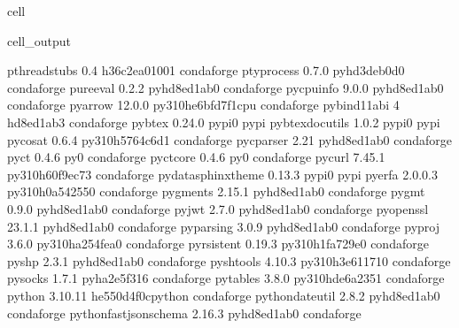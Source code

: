 \documentclass[letterpaper,table,10pt,english]{jupyterBook}
\begin{document}
\begin{sphinxuseclass}{cell}
\begin{sphinxVerbatimOutput}
\begin{sphinxuseclass}{cell_output}
\begin{sphinxVerbatim}[commandchars=\\\{\}]
pthread\PYGZhy{}stubs             0.4               h36c2ea0\PYGZus{}1001    conda\PYGZhy{}forge
ptyprocess                0.7.0              pyhd3deb0d\PYGZus{}0    conda\PYGZhy{}forge
pure\PYGZus{}eval                 0.2.2              pyhd8ed1ab\PYGZus{}0    conda\PYGZhy{}forge
py\PYGZhy{}cpuinfo                9.0.0              pyhd8ed1ab\PYGZus{}0    conda\PYGZhy{}forge
pyarrow                   12.0.0          py310he6bfd7f\PYGZus{}1\PYGZus{}cpu    conda\PYGZhy{}forge
pybind11\PYGZhy{}abi              4                    hd8ed1ab\PYGZus{}3    conda\PYGZhy{}forge
pybtex                    0.24.0                   pypi\PYGZus{}0    pypi
pybtex\PYGZhy{}docutils           1.0.2                    pypi\PYGZus{}0    pypi
pycosat                   0.6.4           py310h5764c6d\PYGZus{}1    conda\PYGZhy{}forge
pycparser                 2.21               pyhd8ed1ab\PYGZus{}0    conda\PYGZhy{}forge
pyct                      0.4.6                      py\PYGZus{}0    conda\PYGZhy{}forge
pyct\PYGZhy{}core                 0.4.6                      py\PYGZus{}0    conda\PYGZhy{}forge
pycurl                    7.45.1          py310h60f9ec7\PYGZus{}3    conda\PYGZhy{}forge
pydata\PYGZhy{}sphinx\PYGZhy{}theme       0.13.3                   pypi\PYGZus{}0    pypi
pyerfa                    2.0.0.3         py310h0a54255\PYGZus{}0    conda\PYGZhy{}forge
pygments                  2.15.1             pyhd8ed1ab\PYGZus{}0    conda\PYGZhy{}forge
pygmt                     0.9.0              pyhd8ed1ab\PYGZus{}0    conda\PYGZhy{}forge
pyjwt                     2.7.0              pyhd8ed1ab\PYGZus{}0    conda\PYGZhy{}forge
pyopenssl                 23.1.1             pyhd8ed1ab\PYGZus{}0    conda\PYGZhy{}forge
pyparsing                 3.0.9              pyhd8ed1ab\PYGZus{}0    conda\PYGZhy{}forge
pyproj                    3.6.0           py310ha254fea\PYGZus{}0    conda\PYGZhy{}forge
pyrsistent                0.19.3          py310h1fa729e\PYGZus{}0    conda\PYGZhy{}forge
pyshp                     2.3.1              pyhd8ed1ab\PYGZus{}0    conda\PYGZhy{}forge
pyshtools                 4.10.3          py310h3e61171\PYGZus{}0    conda\PYGZhy{}forge
pysocks                   1.7.1              pyha2e5f31\PYGZus{}6    conda\PYGZhy{}forge
pytables                  3.8.0           py310hde6a235\PYGZus{}1    conda\PYGZhy{}forge
python                    3.10.11         he550d4f\PYGZus{}0\PYGZus{}cpython    conda\PYGZhy{}forge
python\PYGZhy{}dateutil           2.8.2              pyhd8ed1ab\PYGZus{}0    conda\PYGZhy{}forge
python\PYGZhy{}fastjsonschema     2.16.3             pyhd8ed1ab\PYGZus{}0    conda\PYGZhy{}forge

\end{sphinxVerbatim}
\end{sphinxuseclass}
\end{sphinxVerbatimOutput}
\end{sphinxuseclass}
\end{document}
